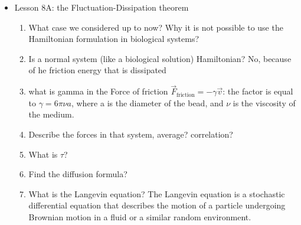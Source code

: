 {\begin{itemize}
    \begin{enumerate}
    	\item What is the Brownian motion? What does it represents?
        \item In which relation are the short atomistic time scales, the relaxation times of the colloids and the diffusion time?
	\item What steps would you like to follow to proceed with the coarse graining?
	\item what is the markov property? and how do you use it in this context?
        \item What is the Smoluchovski equation?
        \item How do you write the infinitesimal change of f in time? What equation does it reminds?
        \item What is the time derivative of f? (Fokker Plank equation )
        \item How are newtonian systems positions related to the time of simulation
        \item How Diffusion dynamics is different? What is the general solution?
        \item Make an example of solving equation of dynamics for diffusion
    \end{enumerate}
    \item Lesson 8A: the Fluctuation-Dissipation theorem
    \begin{enumerate}
        \item What case we considered up to now? Why it is not possible to use the Hamiltonian formulation in biological systems?
        \item Is a normal system (like a biological solution) Hamiltonian? No, because of he friction energy that is dissipated
        \item what is gamma in the Force of friction $\vec{F}_{\text{friction}} = - \gamma \vec{v}$: the \gamma factor is equal to $\gamma = 6 \pi \nu a$, where a is the diameter of the bead, and $\nu$ is the viscosity of the medium.
        \item Describe the forces in that system, average? correlation?
        \item What is $\tau$?
        \item Find the diffusion formula?
        \item What is the Langevin equation? The Langevin equation is a stochastic differential equation that describes the motion of a particle undergoing Brownian motion in a fluid or a similar random environment.

\end{enumerate}
\end{itemize}}
